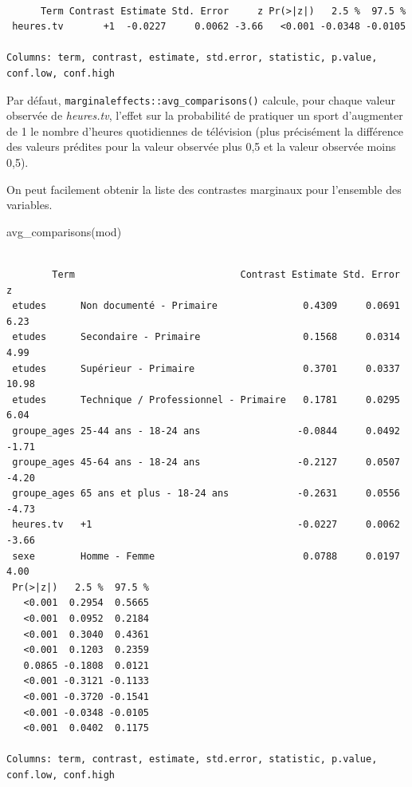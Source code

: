 \documentclass[
  letterpaper,
  DIV=11,
  numbers=noendperiod,
  oneside]{scrreprt}
\newenvironment{Shaded}{\begin{snugshade}}{\end{snugshade}}
\newcommand{\FunctionTok}[1]{\textcolor[rgb]{0.28,0.35,0.67}{#1}}
\newcommand{\NormalTok}[1]{\textcolor[rgb]{0.00,0.23,0.31}{#1}}
\begin{document}
\begin{verbatim}

      Term Contrast Estimate Std. Error     z Pr(>|z|)   2.5 %  97.5 %
 heures.tv       +1  -0.0227     0.0062 -3.66   <0.001 -0.0348 -0.0105

Columns: term, contrast, estimate, std.error, statistic, p.value, conf.low, conf.high 
\end{verbatim}

Par défaut, \texttt{marginaleffects::avg\_comparisons()} calcule, pour
chaque valeur observée de \emph{heures.tv}, l'effet sur la probabilité
de pratiquer un sport d'augmenter de 1 le nombre d'heures quotidiennes
de télévision (plus précisément la différence des valeurs prédites pour
la valeur observée plus 0,5 et la valeur observée moins 0,5).

On peut facilement obtenir la liste des contrastes marginaux pour
l'ensemble des variables.

\begin{Shaded}
\begin{Highlighting}[]
\FunctionTok{avg\_comparisons}\NormalTok{(mod)}
\end{Highlighting}
\end{Shaded}

\begin{verbatim}

        Term                             Contrast Estimate Std. Error     z
 etudes      Non documenté - Primaire               0.4309     0.0691  6.23
 etudes      Secondaire - Primaire                  0.1568     0.0314  4.99
 etudes      Supérieur - Primaire                   0.3701     0.0337 10.98
 etudes      Technique / Professionnel - Primaire   0.1781     0.0295  6.04
 groupe_ages 25-44 ans - 18-24 ans                 -0.0844     0.0492 -1.71
 groupe_ages 45-64 ans - 18-24 ans                 -0.2127     0.0507 -4.20
 groupe_ages 65 ans et plus - 18-24 ans            -0.2631     0.0556 -4.73
 heures.tv   +1                                    -0.0227     0.0062 -3.66
 sexe        Homme - Femme                          0.0788     0.0197  4.00
 Pr(>|z|)   2.5 %  97.5 %
   <0.001  0.2954  0.5665
   <0.001  0.0952  0.2184
   <0.001  0.3040  0.4361
   <0.001  0.1203  0.2359
   0.0865 -0.1808  0.0121
   <0.001 -0.3121 -0.1133
   <0.001 -0.3720 -0.1541
   <0.001 -0.0348 -0.0105
   <0.001  0.0402  0.1175

Columns: term, contrast, estimate, std.error, statistic, p.value, conf.low, conf.high 
\end{verbatim}
\end{document}
